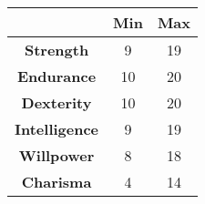 \begin{tabular}{|c|c|c|}
\hline
 & \textbf{Min} & \textbf{Max} \\ \hline
\textbf{Strength} & 9 & 19 \\ \hline
\textbf{Endurance} & 10 & 20 \\ \hline
\textbf{Dexterity} & 10 & 20 \\ \hline
\textbf{Intelligence} & 9 & 19 \\ \hline
\textbf{Willpower} & 8 & 18 \\ \hline
\textbf{Charisma} & 4 & 14 \\ \hline
\end{tabular}


\newpage
